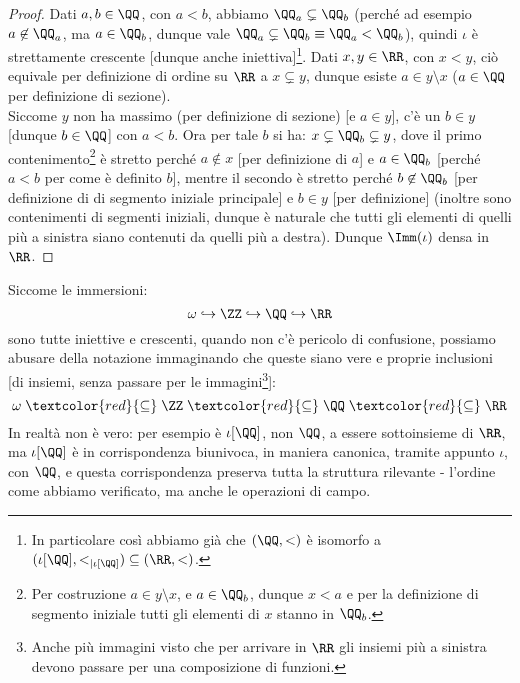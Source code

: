 \documentclass[11pt]{scrartcl}
\begin{document}
\begin{proof}
	Dati $a,b \in \QQ$, con $a < b$, abbiamo $\QQ_a \subsetneq \QQ_b$ (perché ad esempio $a \not \in \QQ_a$, ma $a \in \QQ_b$, dunque vale $\QQ_a \subsetneq \QQ_b \equiv \QQ_a < \QQ_b$), quindi $\iota$ è strettamente crescente [dunque anche iniettiva]\footnote{In particolare così abbiamo già che $(\QQ,<)$ è isomorfo a $(\iota[\QQ],<_{|\iota[\QQ]})\subseteq (\RR,<)$.}.
	Dati $x,y \in \RR$, con $x < y$, ciò equivale per definizione di ordine su $\RR$ a $x \subsetneq y$, dunque esiste $a \in y \setminus x$ ($a \in \QQ$ per definizione di sezione).\\
	Siccome $y$ non ha massimo (per definizione di sezione) [e $a \in y$], c'è un $b \in y$ [dunque $b \in \QQ$] con $a < b$. Ora per tale $b$ si ha: $x \subsetneq \QQ_b \subsetneq y$,
	dove il primo contenimento\footnote{Per costruzione $a \in y\setminus x$, e $a \in \QQ_b$, dunque $x < a$ e per la definizione di segmento iniziale tutti gli elementi di $x$ stanno in $\QQ_b$.} è stretto perché $a \not \in x$ [per definizione di $a$] e $a \in \QQ_b$ [perché $a<b$ per come è definito $b$], mentre 
	il secondo è stretto perché $b \not \in \QQ_b$ [per definizione di di segmento iniziale principale] e $b \in y$ [per definizione] (inoltre sono contenimenti di segmenti iniziali, dunque è naturale che tutti gli elementi di quelli più a sinistra siano contenuti da quelli più a destra). Dunque $\Imm(\iota)$ densa in $\RR$.
\end{proof}
\pagebreak
\begin{notation}
	Siccome le immersioni:
	\[ \omega \hookrightarrow \ZZ \hookrightarrow \QQ \hookrightarrow \RR
		\]
	sono tutte iniettive e crescenti, quando non c'è pericolo di confusione, possiamo abusare della notazione immaginando che 
	queste siano vere e proprie inclusioni [di insiemi, senza passare per le immagini\footnote{Anche più immagini visto che per
	arrivare in $\RR$ gli insiemi più a sinistra devono passare per una composizione di funzioni.}]:
	\[ \omega \;\textcolor{red}{\subseteq}\; \ZZ \;\textcolor{red}{\subseteq} \;\QQ \;\textcolor{red}{\subseteq}\; \RR
		\]
	In realtà non è vero: per esempio è $\iota[\QQ]$, non $\QQ$, a essere sottoinsieme di $\RR$, ma $\iota[\QQ]$ è in corrispondenza biunivoca, in maniera 
	canonica, tramite appunto $\iota$, con $\QQ$, e questa corrispondenza preserva tutta la struttura rilevante - l'ordine come abbiamo verificato, ma anche le 
	operazioni di campo.
\end{notation}
\end{document}
